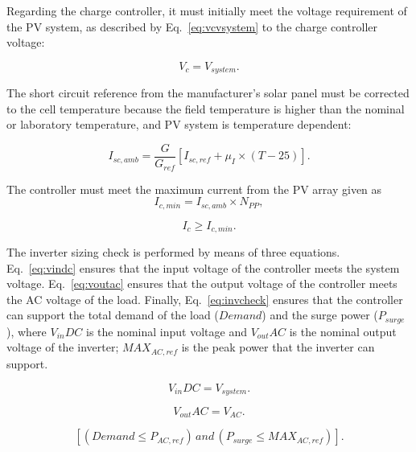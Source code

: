 \documentclass[runningheads]{llncs}
\begin{document}
Regarding the charge controller, it must initially meet the voltage requirement of the PV system, as described by Eq.~\ref{eq:vcvsystem} to the charge controller voltage: 

\begin{equation}
\label{eq:vcvsystem}
V_{c} = V_{system}.
\end{equation}

The short circuit reference from the manufacturer's solar panel must be corrected to the cell temperature because the field temperature is higher than the nominal or laboratory temperature, and PV system is temperature dependent:

\begin{equation}
\label{eq:iscamb}
I_{sc,amb} = \frac{G}{G_{ref}} \left[I_{sc,ref} + \mu_{I} \times (T-25) \right]. 
\end{equation}

The controller must meet the maximum current from the PV array given as
%
\begin{equation}
\label{eq:icmin}
I_{c,min} = I_{sc,amb} \times N_{PP},
\end{equation}

\begin{equation}
\label{eq:icicmin}
I_{c} \geq I_{c,min}.
\end{equation}

The inverter sizing check is performed by means of three equations. Eq.~\ref{eq:vindc} ensures that the input voltage of the controller meets the system voltage. Eq.~\ref{eq:voutac} ensures that the output voltage of the controller meets the AC voltage of the load. Finally, Eq.~\ref{eq:invcheck} ensures that the controller can support the total demand of the load ($Demand$) and the surge power ($P_{surge}$), where $V_{in}DC$ is the nominal input voltage and $V_{out}AC$ is the nominal output voltage of the inverter; $MAX_{AC,ref}$ is the peak power that the inverter can support.

\begin{equation}
\label{eq:vindc} 
V_{in}DC = V_{system}.
\end{equation}

\begin{equation}
\label{eq:voutac} 
V_{out}AC = V_{AC}.
\end{equation}

\begin{equation}
\label{eq:invcheck} 
\left[ (Demand \leq P_{AC,ref}) \, and \, (P_{surge} \leq MAX_{AC,ref}) \right].
\end{equation}
\end{document}
